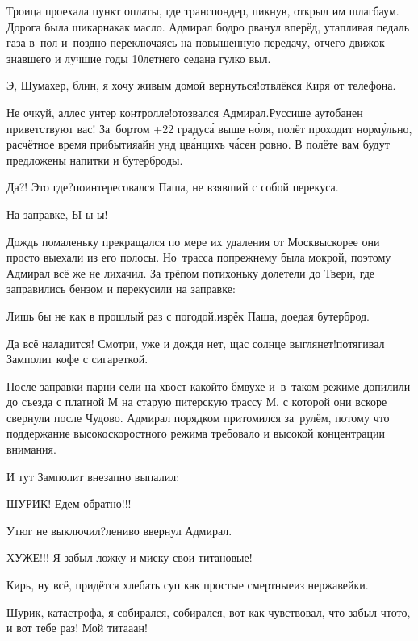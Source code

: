 Троица проехала пункт оплаты, где транспондер, пикнув, открыл им шлагбаум. Дорога была шикарна\mdash как масло. Адмирал бодро рванул вперёд, утапливая педаль газа в~пол и~поздно переключаясь на повышенную передачу, отчего движок знавшего и лучшие годы 10\sdash летнего седана гулко выл. 

\diagdash Э, Шумахер, блин, я хочу живым домой вернуться!\mdash отвлёкся Киря от телефона.

\diagdash Не очкуй, аллес унтер контролле!\mdash отозвался Адмирал.\mdash Руссише аутобанен приветствуют вас! За~бортом +22 градус\'{а} выше н\'{о}ля, полёт проходит норм\'{у}льно, расчётное время прибытия\mdash айн унд цв\'{а}нцихъ ч\'{а}сен ровно. В полёте вам будут предложены напитки и бутерброды.

\diagdash Да?! Это где?\mdash поинтересовался Паша, не взявший с собой перекуса.

\diagdash На заправке, Ы-ы-ы!

Дождь помаленьку прекращался по мере их удаления от Москвы\mdash скорее они просто выехали из его полосы. Но~трасса по\sdash прежнему была мокрой, поэтому Адмирал всё же не лихачил. За трёпом потихоньку долетели до Твери, где заправились бензом и перекусили на заправке:

\diagdash Лишь бы не как в прошлый раз с погодой.\mdash изрёк Паша, доедая бутерброд.

\diagdash Да всё наладится! Смотри, уже и дождя нет, щас солнце выглянет!\mdash потягивал Замполит кофе с сигареткой.

После заправки парни сели на хвост какой\sdash то бмв\sdash ухе и~в~таком режиме допилили до съезда с платной М на старую питерскую трассу М, с которой они вскоре свернули после Чудово. Адмирал порядком притомился за~рулём, потому что поддержание высокоскоростного режима требовало и высокой концентрации внимания. 

И тут Замполит внезапно выпалил:

\diagdash ШУРИК! Едем обратно!!!

\diagdash Утюг не выключил?\mdash лениво ввернул Адмирал.

\diagdash ХУЖЕ!!! Я забыл ложку и миску свои титановые!

\diagdash Кирь, ну всё, придётся хлебать суп как простые смертные\mdash из нержавейки.

\diagdash Шурик, катастрофа, я собирался, собирался, вот как чувствовал, что забыл что\sdash то, и вот тебе раз! Мой тита\sdash а\sdash ан!

